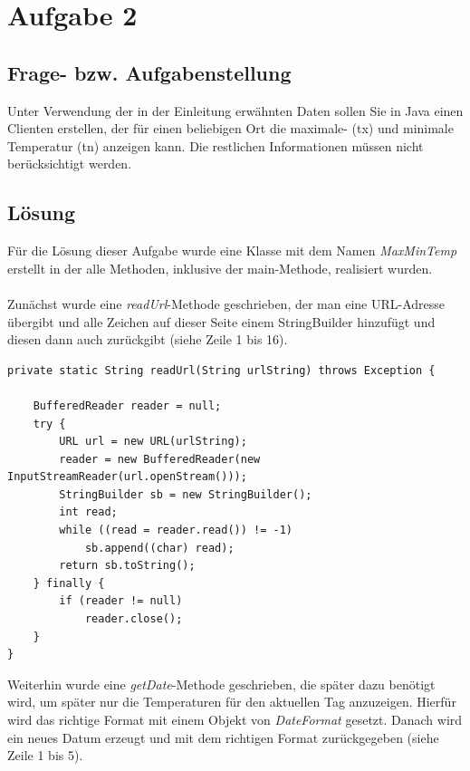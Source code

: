 \newcommand{\env}[1]{\texttt{#1}}
\newcommand{\command}[1]{\texttt{#1}}
\newcommand{\package}[1]{\texttt{\itshape#1}}
\newcommand{\engl}[1]{(engl: \textit{#1})\xspace}
\setlength{\parindent}{0pt}
\lstset{extendedchars=\true}
\lstset{inputencoding=ansinew}
\newpage

\section{Aufgabe 2}\cite{[1]}

\subsection{Frage- bzw. Aufgabenstellung}

Unter Verwendung der in der Einleitung erwähnten Daten sollen Sie in Java einen Clienten erstellen, der für einen beliebigen Ort die maximale- (tx) und minimale Temperatur (tn) anzeigen kann. Die restlichen Informationen müssen nicht berücksichtigt werden.

\subsection{Lösung}

Für die Lösung dieser Aufgabe wurde eine Klasse mit dem Namen \textit{MaxMinTemp} erstellt in der alle Methoden, inklusive der main-Methode, realisiert wurden. \\
\\
Zunächst wurde eine \textit{readUrl}-Methode geschrieben, der man eine URL-Adresse übergibt und alle Zeichen auf dieser Seite einem StringBuilder hinzufügt und diesen dann auch zurückgibt (siehe Zeile 1 bis 16).

\begin{lstlisting}[caption={readUrl-Methode}]
private static String readUrl(String urlString) throws Exception {

	BufferedReader reader = null;
	try {
		URL url = new URL(urlString);
		reader = new BufferedReader(new InputStreamReader(url.openStream()));
		StringBuilder sb = new StringBuilder();
		int read;
		while ((read = reader.read()) != -1)
			sb.append((char) read);
		return sb.toString();
	} finally {
		if (reader != null)
			reader.close();
	}
}
\end{lstlisting}

Weiterhin wurde eine \textit{getDate}-Methode geschrieben, die später dazu benötigt wird, um später nur die Temperaturen für den aktuellen Tag anzuzeigen. Hierfür wird das richtige Format mit einem Objekt von \textit{DateFormat} gesetzt. Danach wird ein neues Datum erzeugt und mit dem richtigen Format zurückgegeben (siehe Zeile 1 bis 5).

